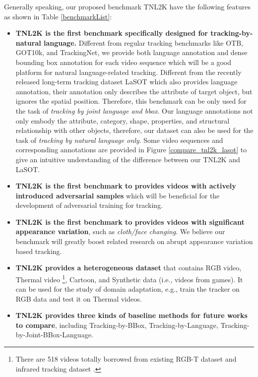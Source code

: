 \documentclass[final]{cvpr}
\begin{document}
Generally speaking, our proposed benchmark TNL2K have the following features as shown in Table \ref{benchmarkList}:  
\begin{itemize}

\item \textbf{TNL2K is the first benchmark specifically designed for tracking-by-natural language.} Different from regular tracking benchmarks like OTB, GOT10k, and TrackingNet, we provide both language annotation and dense bounding box annotation for each video sequence which will be a good platform for natural language-related tracking. Different from the recently released long-term tracking dataset LaSOT which also provides language annotation, their annotation only describes the attribute of target object, but ignores the spatial position. Therefore, this benchmark can be only used for the task of \emph{tracking by joint language and bbox}. Our language annotations not only embody the attribute, category, shape, properties, and structural relationship with other objects, therefore, our dataset can also be used for the task of \emph{tracking by natural language only}. Some video sequences and corresponding annotations are provided in Figure \ref{compare_tnl2k_lasot} to give an intuitive understanding of the difference between our TNL2K and LaSOT. 

\item \textbf{TNL2K is the first benchmark to provides videos with actively introduced adversarial samples} which will be beneficial for the development of adversarial training for tracking. 

\item \textbf{TNL2K is the first benchmark to provides videos with significant appearance variation}, such as \emph{cloth/face changing}. We believe our benchmark will greatly boost related research on abrupt appearance variation based tracking.  

\item \textbf{TNL2K provides a heterogeneous dataset} that contains RGB video, Thermal video \footnote{There are 518 videos totally borrowed from existing RGB-T dataset \cite{li2019rgbt234} and infrared tracking dataset \cite{liu2019ptbtracking}.}, Cartoon, and Synthetic data (i.e., videos from games). It can be used for the study of domain adaptation, e.g., train the tracker on RGB data and test it on Thermal videos. 

\item \textbf{TNL2K provides three kinds of baseline methods for future works to compare}, including Tracking-by-BBox, Tracking-by-Language, Tracking-by-Joint-BBox-Language. 


\end{itemize}
\end{document}
